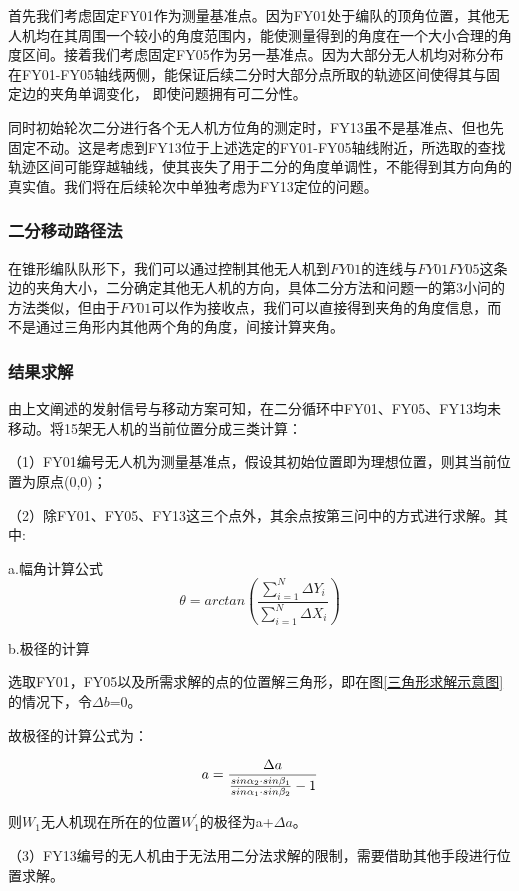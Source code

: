 \documentclass{ctexart}
\begin{document}
首先我们考虑固定FY01作为测量基准点。因为FY01处于编队的顶角位置，其他无人机均在其周围一个较小的角度范围内，能使测量得到的角度在一个大小合理的角度区间。接着我们考虑固定FY05作为另一基准点。因为大部分无人机均对称分布在FY01-FY05轴线两侧，能保证后续二分时大部分点所取的轨迹区间使得其与固定边的夹角单调变化，
即使问题拥有可二分性。

同时初始轮次二分进行各个无人机方位角的测定时，FY13虽不是基准点、但也先固定不动。这是考虑到FY13位于上述选定的FY01-FY05轴线附近，所选取的查找轨迹区间可能穿越轴线，使其丧失了用于二分的角度单调性，不能得到其方向角的真实值。我们将在后续轮次中单独考虑为FY13定位的问题。

\subsubsection{二分移动路径法}
在锥形编队队形下，我们可以通过控制其他无人机到$FY01$的连线与$FY01FY05$这条边的夹角大小，二分确定其他无人机的方向，具体二分方法和问题一的第3小问的方法类似，但由于$FY01$可以作为接收点，我们可以直接得到夹角的角度信息，而不是通过三角形内其他两个角的角度，间接计算夹角。

\subsubsection{结果求解}

由上文阐述的发射信号与移动方案可知，在二分循环中FY01、FY05、FY13均未移动。将15架无人机的当前位置分成三类计算：

（1）FY01编号无人机为测量基准点，假设其初始位置即为理想位置，则其当前位置为原点(0,0)；

（2）除FY01、FY05、FY13这三个点外，其余点按第三问中的方式进行求解。其中:

a.幅角计算公式
\[
  \theta=arctan(\frac{\sum_{i=1}^{N}\Delta Y_i}{\sum_{i=1}^{N}\Delta X_i})
\]

b.极径的计算

选取FY01，FY05以及所需求解的点的位置解三角形，即在图\ref{三角形求解示意图}的情况下，令$\Delta b$=0。

故极径的计算公式为：

\begin{equation}
              a=\frac{\Delta a}{\frac{sin\alpha_2\cdot sin\beta_1}{sin\alpha_1\cdot sin\beta_2}-1}\\
\end{equation}

则$W_1$无人机现在所在的位置$W_1^{'}$的极径为a+$\Delta a$。

（3）FY13编号的无人机由于无法用二分法求解的限制，需要借助其他手段进行位置求解。
\end{document}
